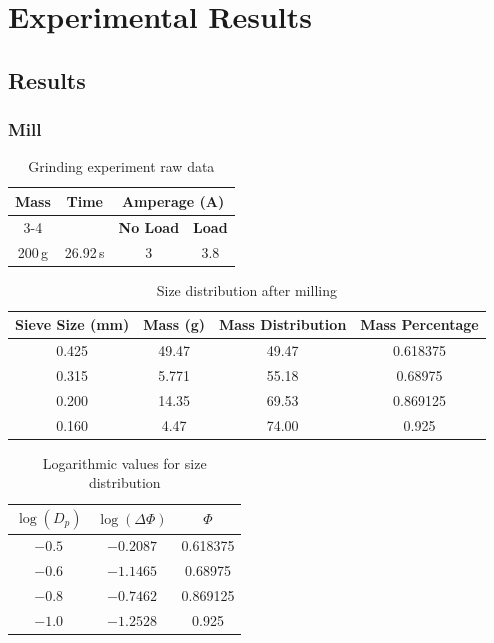 \section{Experimental Results}

\subsection{Results}

\subsubsection{Mill}

\begin{table}[H]
    \centering
    \caption{Grinding experiment raw data}
    \begin{tabular}{cccc}
        \hline
        \textbf{Mass} & \textbf{Time} & \multicolumn{2}{c}{\textbf{Amperage (A)}} \\ \cline{3-4}
                      &               & \textbf{No Load}      & \textbf{Load} \\
        \hline
        200\,g        & 26.92\,s      & 3                     & 3.8 \\
        \hline
    \end{tabular}
\end{table}

\begin{table}[H]
    \centering
    \caption{Size distribution after milling}
    \begin{tabular}{cccc}
        \hline
        \textbf{Sieve Size (mm)} & \textbf{Mass (g)} & \textbf{Mass Distribution} & \textbf{Mass Percentage} \\
        \hline
        0.425 & 49.47 & 49.47 & 0.618375 \\
        0.315 & 5.771 & 55.18 & 0.68975  \\
        0.200 & 14.35 & 69.53 & 0.869125 \\
        0.160 & 4.47  & 74.00 & 0.925    \\
        \hline
    \end{tabular}
\end{table}

\begin{table}[H]
    \centering
    \caption{Logarithmic values for size distribution}
    \begin{tabular}{ccc}
        \hline
        $\log(D_p)$ & $\log(\Delta\varPhi)$ & $\varPhi$ \\
        \hline
        $-0.5$  & $-0.2087$ & 0.618375 \\
        $-0.6$  & $-1.1465$ & 0.68975  \\
        $-0.8$  & $-0.7462$ & 0.869125 \\
        $-1.0$  & $-1.2528$ & 0.925    \\
        \hline
    \end{tabular}
\end{table}

